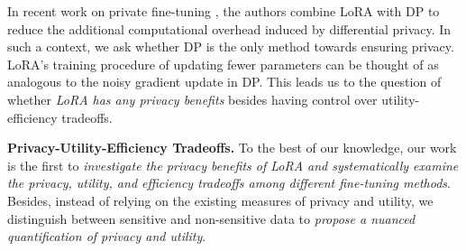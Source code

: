 In recent work on private fine-tuning \cite{liu2023differentially, yu2021differentially,ma2024efficient}, the authors combine LoRA with DP to reduce the additional computational overhead induced by differential privacy. In such a context, we ask whether DP is the only method towards ensuring privacy. LoRA's training procedure of updating fewer parameters can be thought of as analogous to the noisy gradient update in DP. This leads us to the question of whether \textit{LoRA has any privacy benefits} besides having control over utility-efficiency tradeoffs. 


\noindent
\textbf{Privacy-Utility-Efficiency Tradeoffs.}
To the best of our knowledge, our work is the first to \textit{investigate the privacy benefits of LoRA and systematically examine the privacy, utility, and efficiency tradeoffs among different fine-tuning methods}. Besides, instead of relying on the existing measures of privacy and utility, we distinguish between sensitive and non-sensitive data to \textit{propose a nuanced quantification of privacy and utility}.  

